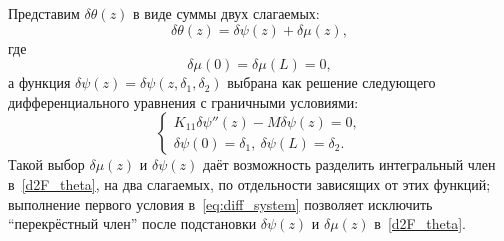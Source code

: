 Представим $\delta \theta(z)$ в виде суммы двух слагаемых:
\begin{equation}\label{thetamupsi}
\delta\theta(z) = \delta\psi(z) + \delta\mu(z),
\end{equation}
где
\begin{equation}\label{mu0=muL=0}
\delta\mu(0) = \delta\mu(L) = 0,
\end{equation}
а функция $\delta\psi(z)=\delta\psi(z,\delta_1,\delta_2)$ выбрана как решение следующего дифференциального уравнения с граничными условиями:
\begin{equation}\label{eq:diff_system}
\begin{cases}
K_{11} \delta\psi''(z) - M\delta\psi(z) = 0,\\
\delta\psi(0) = \delta_1,\ \delta\psi(L) = \delta_2.
\end{cases}
\end{equation}
Такой выбор $\delta\mu(z)$ и $\delta\psi(z)$ даёт возможность разделить интегральный член в~\eqref{d2F_theta}, на два слагаемых, по отдельности зависящих от этих функций; выполнение первого условия в~\eqref{eq:diff_system} позволяет исключить ``перекрёстный член'' после подстановки $\delta\psi(z)$ и $\delta\mu(z)$ в~\eqref{d2F_theta}.

